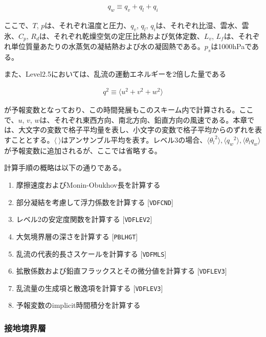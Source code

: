 \begin{eqnarray} q_w \equiv q_v+q_l+q_i \end{eqnarray}

ここで、\(T\), \(p\)は、それぞれ温度と圧力、\(q_v\), \(q_l\),
\(q_i\)は、それぞれ比湿、雲水、雲氷、\(C_p\),
\(R_d\)は、それぞれ乾燥空気の定圧比熱および気体定数、\(L_v\),
\(L_f\)は、それぞれ単位質量あたりの水蒸気の凝結熱および水の凝固熱である。\(p_s\)は1000hPaである。

また、Level2.5においては、乱流の運動エネルギーを2倍した量である

\begin{eqnarray}q^2 \equiv \langle u^2 + v^2 + w^2 \rangle\end{eqnarray}

が予報変数となっており、この時間発展もこのスキーム内で計算される。ここで、\(u\),
\(v\),
\(w\)は、それぞれ東西方向、南北方向、鉛直方向の風速である。本章では、大文字の変数で格子平均量を表し、小文字の変数で格子平均からのずれを表すこととする。\(\langle \ \rangle\)はアンサンブル平均を表す。レベル3の場合、\(\langle {\theta_l}^2 \rangle,\langle {q_w}^2 \rangle,\langle \theta_l q_w \rangle\)
が予報変数に追加されるが、ここでは省略する。

計算手順の概略は以下の通りである。

\begin{enumerate}
\def\labelenumi{\arabic{enumi}.}
\tightlist
\item
  摩擦速度およびMonin-Obukhov長を計算する
\item
  部分凝結を考慮して浮力係数を計算する {[}\texttt{VDFCND}{]}
\item
  レベル2の安定度関数を計算する {[}\texttt{VDFLEV2}{]}
\item
  大気境界層の深さを計算する {[}\texttt{PBLHGT}{]}
\item
  乱流の代表的長さスケールを計算する {[}\texttt{VDFMLS}{]}
\item
  拡散係数および鉛直フラックスとその微分値を計算する
  {[}\texttt{VDFLEV3}{]}
\item
  乱流量の生成項と散逸項を計算する {[}\texttt{VDFLEV3}{]}
\item
  予報変数のimplicit時間積分を計算する
\end{enumerate}

\hypertarget{ux63a5ux5730ux5883ux754cux5c64}{%
\subsubsection{接地境界層}\label{ux63a5ux5730ux5883ux754cux5c64}}

